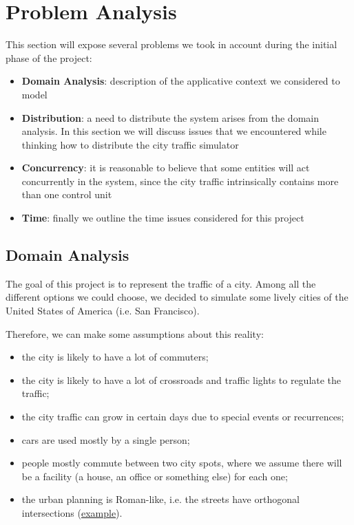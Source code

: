 \section{Problem Analysis}

This section will expose several problems we took in account during the
initial phase of the project:

\begin{itemize}
\item \textbf{Domain Analysis}: description of the applicative context we
  considered to model
\item \textbf{Distribution}: a need to distribute the system arises from the
  domain analysis. In this section we will discuss issues that we encountered
  while thinking how to distribute the city traffic simulator
\item \textbf{Concurrency}: it is reasonable to believe that some entities
  will act concurrently in the system, since the city traffic intrinsically
  contains more than one control unit
\item \textbf{Time}: finally we outline the time issues considered for this project 
\end{itemize}

\subsection{Domain Analysis}\label{sec:pa-domain}
The goal of this project is to represent the traffic of a city. Among all the
different options we could choose, we decided to simulate some lively cities of
the United States of America (i.e. San Francisco).

Therefore, we can make some assumptions about this reality:

\begin{itemize}
\item the city is likely to have a lot of commuters;
\item the city is likely to have a lot of crossroads and
traffic lights to regulate the traffic;
\item the city traffic can grow in certain days due to special events or
  recurrences;
\item cars are used mostly by a single person;
\item people mostly commute between two city spots, where we assume there
  will be a facility (a house, an office or something else) for each one;
\item the urban planning is Roman-like, i.e. the streets have orthogonal
  intersections (\href{https://www.google.it/maps/place/San+Francisco,+California,+Stati+Uniti/@37.7766566,-122.4330836,16z/data=!4m2!3m1!1s0x80859a6d00690021:0x4a501367f076adff}{example}).
\end{itemize}

